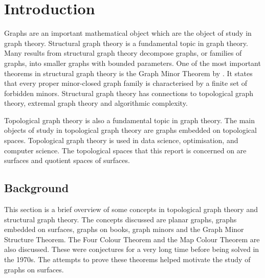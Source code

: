 \chapter{Introduction}\label{sec:introduction}
Graphs are an important mathematical object which are the object of study in graph theory. 
Structural graph theory is a fundamental topic in graph theory. Many results from structural graph theory decompose graphs, or families of graphs, into smaller graphs with bounded parameters. One of the most important theorems in structural graph theory is the Graph Minor Theorem by \textcite{robertsonGraphMinorsXX2004}. It states that every proper minor-closed graph family is characterised by a finite set of forbidden minors. Structural graph theory has connections to topological graph theory, extremal graph theory and algorithmic complexity. 

Topological graph theory is also a fundamental topic in graph theory. The main objects of study in topological graph theory are graphs embedded on topological spaces. Topological graph theory is used in data science, optimisation, and computer science. The topological spaces that this report is concerned on are surfaces and quotient spaces of surfaces. 





\newpage
\section{Background}\label{sec:background}
This section is a brief overview of some concepts in topological graph theory and structural graph theory. The concepts discussed are planar graphs, graphs embedded on surfaces, graphs on books, graph minors and the Graph Minor Structure Theorem. The Four Colour Theorem and the Map Colour Theorem are also discussed. These were conjectures for a very long time before being solved in the 1970s. The attempts to prove these theorems helped motivate the study of graphs on surfaces.


%

%



